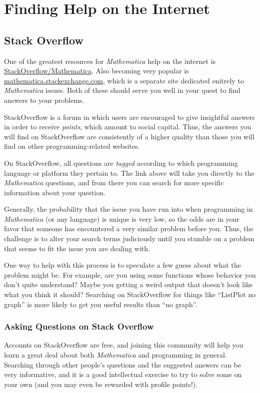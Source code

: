 \appendix
\chapter{Finding Help on the Internet}

\section{Stack Overflow}
One of the greatest resources for \emph{Mathematica} help on the internet is \href{http://stackoverflow.com/questions/tagged/mathematica}{StackOverflow/Mathematica}. Also becoming very popular is \href{http://mathematica.stackexchange.com/}{mathematica.stackexchange.com}, which is a separate site dedicated enitrely to \emph{Mathematica} issues. Both of these should serve you well in your quest to find answers to your problems.

StackOverflow is a forum in which users are encouraged to give insightful answers in order to receive \emph{points}, which amount to social capital. Thus, the answers you will find on StackOverflow are consistently of a higher quality than those you will find on other programming-related websites.

On StackOverflow, all questions are \emph{tagged} according to which programming language or platform they pertain to. The link above will take you directly to the \emph{Mathematica} questions, and from there you can search for more specific information about your question.

Generally, the probability that the issue you have run into when programming in \emph{Mathematica} (or any language) is unique is very low, so the odds are in your favor that someone has encountered a very similar problem before you. Thus, the challenge is to alter your search terms judiciously until you stumble on a problem that seems to fit the issue you are dealing with.

One way to help with this process is to speculate a few guess about what the problem might be. For example, are you using some functions whose behavior you don't quite understand? Maybe you getting a weird output that doesn't look like what you think it should? Searching on StackOverflow for things like ``ListPlot no graph'' is more likely to get you useful results than ``no graph''. 

\subsection{Asking Questions on Stack Overflow}
Accounts on StackOverflow are free, and joining this community will help you learn a great deal about both \emph{Mathematica} and programming in general. Searching through other people's questions and the suggested answers can be very informative, and it is a good intellectual exercise to try to solve some on your own (and you may even be rewarded with profile points!).

